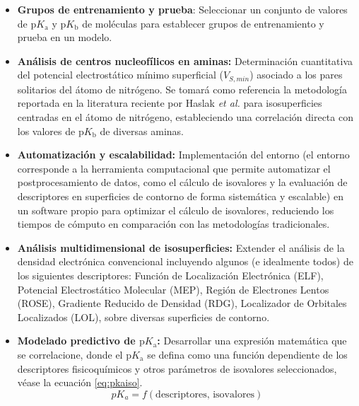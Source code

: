 \documentclass[12pt]{article}
\begin{document}
	\begin{itemize}
		
		\item \textbf{Grupos de entrenamiento y prueba}: Seleccionar un conjunto de valores de $\mathrm{p}K_{\mathrm{a}}$ y $\mathrm{p}K_{\mathrm{b}}$ de mol\'{e}culas para establecer grupos de entrenamiento y prueba en un modelo.
	
		
		\item \textbf{An\'{a}lisis de centros nucleof\'{i}licos en aminas:} Determinaci\'{o}n cuantitativa del potencial electrost\'{a}tico m\'{i}nimo superficial ($V_{S,min}$) asociado a los pares solitarios del \'{a}tomo de nitr\'{o}geno. Se tomar\'{a} como referencia la metodolog\'{i}a reportada en la literatura reciente por Haslak \textit{et al.} \cite{Haslak2021} para isosuperficies centradas en el \'{a}tomo de nitr\'{o}geno, estableciendo una correlaci\'{o}n directa con los valores de $\mathrm{p}K_{\mathrm{b}}$ de diversas aminas.
		
		\item \textbf{Automatizaci\'{o}n y escalabilidad:} Implementaci\'{o}n del entorno (el entorno corresponde a la herramienta computacional que permite automatizar el postprocesamiento de datos, como el c\'{a}lculo de isovalores y la evaluaci\'{o}n de descriptores en superficies de contorno de forma sistem\'{a}tica y escalable) en un software propio para optimizar el c\'{a}lculo de isovalores, reduciendo los tiempos de c\'{o}mputo en comparaci\'{o}n con las metodolog\'{i}as tradicionales.
		
		\item \textbf{An\'{a}lisis multidimensional de isosuperficies:} Extender el an\'{a}lisis de la densidad electr\'{o}nica convencional incluyendo algunos (e idealmente todos) de los siguientes descriptores: Funci\'{o}n de Localizaci\'{o}n Electr\'{o}nica (ELF), Potencial Electrost\'{a}tico Molecular (MEP), Regi\'{o}n de Electrones Lentos (ROSE), Gradiente Reducido de Densidad (RDG), Localizador de Orbitales Localizados (LOL), sobre diversas superficies de contorno.
		
		\clearpage
		
		\item \textbf{Modelado predictivo de $\mathrm{p}K_{\mathrm{a}}$:} Desarrollar una expresi\'{o}n matem\'{a}tica que se correlacione, donde el $\mathrm{p}K_{\mathrm{a}}$ se defina como una funci\'{o}n dependiente de los descriptores fisicoqu\'{i}micos y otros par\'{a}metros de isovalores seleccionados, v\'{e}ase la ecuaci\'{o}n \ref{eq:pkaiso}.
		\begin{equation}
			pK_a = f(\text{descriptores, isovalores})
			\label{eq:pkaiso}
		\end{equation}
	\end{itemize}
	
\end{document}
